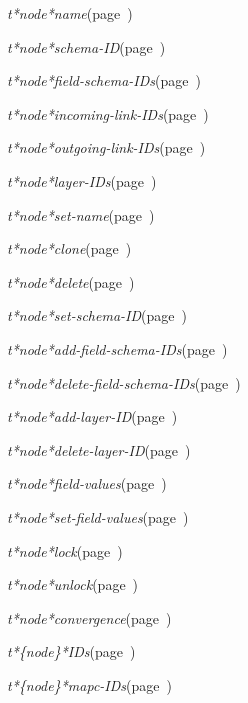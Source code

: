 \begin{description}
\item [Attributes:]
\item {\sl t*node*name}\hfill(page~\pageref{t*node*name})
\item {\sl t*node*schema-ID}\hfill(page~\pageref{t*node*schema-ID})
\item {\sl t*node*field-schema-IDs}\hfill(page~\pageref{t*node*field-schema-IDs})
\item {\sl t*node*incoming-link-IDs}\hfill(page~\pageref{t*node*incoming-link-IDs})
\item {\sl t*node*outgoing-link-IDs}\hfill(page~\pageref{t*node*outgoing-link-IDs})
\item {\sl t*node*layer-IDs}\hfill(page~\pageref{t*node*layer-IDs})

\item [Operations:]
\item {\sl t*node*set-name}\hfill(page~\pageref{t*node*set-name})
\item {\sl t*node*clone}\hfill(page~\pageref{t*node*clone})
\item {\sl t*node*delete}\hfill(page~\pageref{t*node*delete})
\item {\sl t*node*set-schema-ID}\hfill(page~\pageref{t*node*set-schema-ID})
\item {\sl t*node*add-field-schema-IDs}\hfill(page~\pageref{t*node*add-field-schema-IDs})
\item {\sl t*node*delete-field-schema-IDs}\hfill(page~\pageref{t*node*delete-field-schema-IDs})
\item {\sl t*node*add-layer-ID}\hfill(page~\pageref{t*node*add-layer-ID})
\item {\sl t*node*delete-layer-ID}\hfill(page~\pageref{t*node*delete-layer-ID})
\item {\sl t*node*field-values}\hfill(page~\pageref{t*node*field-values})
\item {\sl t*node*set-field-values}\hfill(page~\pageref{t*node*set-field-values})
\item {\sl t*node*lock}\hfill(page~\pageref{t*node*lock})
\item {\sl t*node*unlock}\hfill(page~\pageref{t*node*unlock})
\item {\sl t*node*convergence}\hfill(page~\pageref{t*node*convergence})
 
\item {\sl t*\{node\}*IDs}\hfill(page~\pageref{t*node*IDs})
\item {\sl t*\{node\}*mapc-IDs}\hfill(page~\pageref{t*node*mapc-IDs})

\item [Subclasses:]


\item [Superclasses:]


\item [Instances:]



\end{description}
\horizontalline

